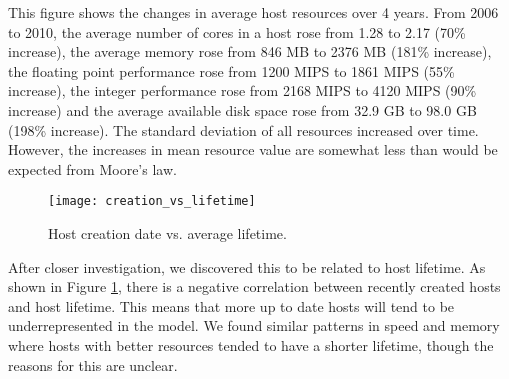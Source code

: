 \documentclass[conference]{IEEEtran}
\begin{document}
This figure shows the changes in average host resources over 4 years.  From 2006 to 2010, the average number of cores in a host rose from 1.28 to 2.17 (70\% increase), the average memory rose from 846 MB to 2376 MB (181\% increase), the floating point performance rose from 1200 MIPS to 1861 MIPS (55\% increase), the integer performance rose from 2168 MIPS to 4120 MIPS (90\% increase) and the average available disk space rose from 32.9 GB to 98.0 GB (198\% increase).  The standard deviation of all resources  increased over time.  However, the increases in mean resource value are somewhat less than would be expected from Moore's law.

\begin{figure}[!t]
\centering
\texttt{[image: creation\_vs\_lifetime]}
\caption{Host creation date vs. average lifetime.}
\label{fig-creation-vs-lifetime}
\end{figure}

After closer investigation, we discovered this to be related to host lifetime.  As shown in Figure \ref{fig-creation-vs-lifetime}, there is a negative correlation between recently created hosts and host lifetime.  This means that more up to date hosts will tend to be underrepresented in the model.  We found similar patterns in speed and memory where hosts with better resources tended to have a shorter lifetime, though the reasons for this are unclear.
\end{document}

